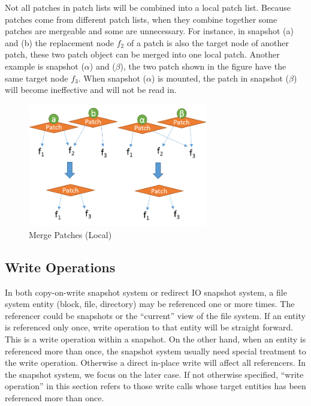     Not all patches in patch lists will be combined into a local patch list. Because patches come from different patch lists, when they combine together some patches are mergeable and some are unnecessary. For instance, in  snapshot (a) and (b) the replacement node $f_2$ of a patch is also the target node of another patch, these two patch object can be merged into one local patch. Another example is snapshot ($\alpha$) and ($\beta$), the two patch shown in the figure have the same target node $f_3$. When snapshot ($\alpha$) is mounted, the patch in snapshot ($\beta$) will become ineffective and will not be read in.

\begin{figure}[t]
\centering
\includegraphics[width=0.7\textwidth]{Chapter-4/figs/fig19.png}
\caption{Merge Patches (Local)}
\label{fig:merge}
\end{figure}

\subsection{Write Operations}

    In both copy-on-write snapshot system or redirect IO snapshot system, a file system entity (block, file, directory) may be referenced one or more times. The referencer could be snapshots or the ``current'' view of the file system. If an entity is referenced only once, write operation to that entity will be straight forward. This is a write operation within a snapshot. On the other hand, when an entity is referenced more than once, the snapshot system usually need special treatment to the write operation. Otherwise a direct in-place write will affect all referencers. In the snapshot system, we focus on the later case. If not otherwise specified, ``write operation'' in this section refers to those write calls whose target entities has been referenced more than once.

